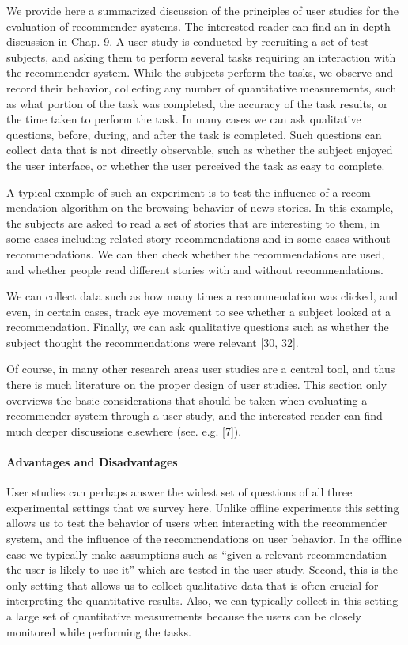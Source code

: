 We provide here a summarized discussion of the principles of user studies for the evaluation of recommender systems. The interested reader can find an in depth discussion in Chap. 9.
A user study is conducted by recruiting a set of test subjects, and asking them to perform several tasks requiring an interaction with the recommender system. While the subjects perform the tasks, we observe and record their behavior, collecting any number of quantitative measurements, such as what portion of the task was completed, the accuracy of the task results, or the time taken to perform the task. In many cases we can ask qualitative questions, before, during, and after the task is completed. Such questions can collect data that is not directly observable, such as whether the subject enjoyed the user interface, or whether the user perceived the task as easy to complete.

A typical example of such an experiment is to test the influence of a recom- mendation algorithm on the browsing behavior of news stories. In this example, the subjects are asked to read a set of stories that are interesting to them, in some cases including related story recommendations and in some cases without recommendations. We can then check whether the recommendations are used, and whether people read different stories with and without recommendations.

We can collect data such as how many times a recommendation was clicked, and even, in certain cases, track eye movement to see whether a subject looked at a recommendation. Finally, we can ask qualitative questions such as whether the subject thought the recommendations were relevant [30, 32].

Of course, in many other research areas user studies are a central tool, and thus there is much literature on the proper design of user studies. This section only overviews the basic considerations that should be taken when evaluating a recommender system through a user study, and the interested reader can find much deeper discussions elsewhere (see. e.g. [7]).

\paragraph{Advantages and Disadvantages}

User studies can perhaps answer the widest set of questions of all three experimental settings that we survey here. Unlike offline experiments this setting allows us to test the behavior of users when interacting with the recommender system, and the influence of the recommendations on user behavior. In the offline case we typically make assumptions such as “given a relevant recommendation the user is likely to use it” which are tested in the user study. Second, this is the only setting that allows us to collect qualitative data that is often crucial for interpreting the quantitative results. Also, we can typically collect in this setting a large set of quantitative measurements because the users can be closely monitored while performing the tasks.

